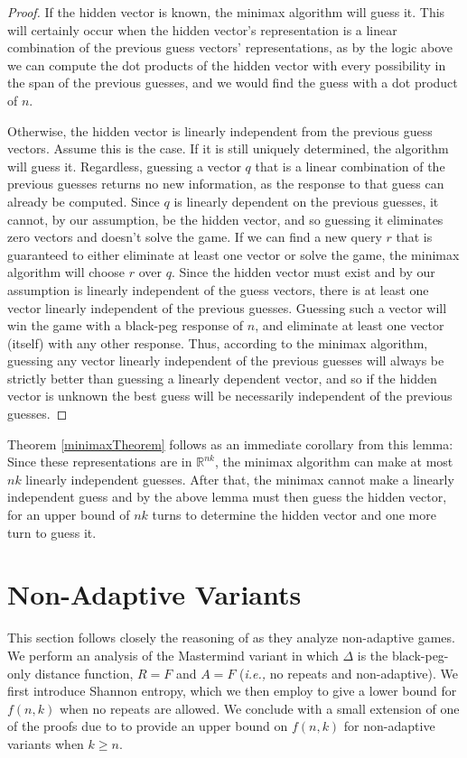 \documentclass[12pt, a4paper]{article}
\newcommand{\R}{\mathbb{R}}           %
\begin{document}
\begin{proof}
	If the hidden vector is known, the minimax algorithm will guess it. This will certainly occur when the hidden vector's representation is a linear combination of the previous guess vectors' representations, as by the logic above we can compute the dot products of the hidden vector with every possibility in the span of the previous guesses, and we would find the guess with a dot product of $n$.
	
	Otherwise, the hidden vector is linearly independent from the previous guess vectors. Assume this is the case. If it is still uniquely determined, the algorithm will guess it. Regardless, guessing a vector $q$ that is a linear combination of the previous guesses returns no new information, as the response to that guess can already be computed. Since $q$ is linearly dependent on the previous guesses, it cannot, by our assumption, be the hidden vector, and so guessing it eliminates zero vectors and doesn't solve the game. If we can find a new query $r$ that is guaranteed to either eliminate at least one vector or solve the game, the minimax algorithm will choose $r$ over $q$. Since the hidden vector must exist and by our assumption is linearly independent of the guess vectors, there is at least one vector linearly independent of the previous guesses. Guessing such a vector will win the game with a black-peg response of $n$, and eliminate at least one vector (itself) with any other response. Thus, according to the minimax algorithm, guessing any vector linearly independent of the previous guesses will always be strictly better than guessing a linearly dependent vector, and so if the hidden vector is unknown the best guess will be necessarily independent of the previous guesses.
\end{proof}
Theorem \ref{minimaxTheorem} follows as an immediate corollary from this lemma: Since these representations are in $\R^{nk}$, the minimax algorithm can make at most $nk$ linearly independent guesses. After that, the minimax cannot make a linearly independent guess and by the above lemma must then guess the hidden vector, for an upper bound of $nk$ turns to determine the hidden vector and one more turn to guess it.

\section{Non-Adaptive Variants}
This section follows closely the reasoning of \cite{DS13} as they analyze non-adaptive games.  We perform an analysis of the Mastermind variant in which $\Delta$ is the black-peg-only distance function, $R=F$ and $A=F$ (\textit{i.e.,} no repeats and non-adaptive). We first introduce Shannon entropy, which we then employ to give a lower bound for $f(n,k)$ when no repeats are allowed. We conclude with a small extension of one of the proofs due to \cite{DS13} to provide an upper bound on $f(n,k)$ for non-adaptive variants when $k\ge n$.
\end{document}
